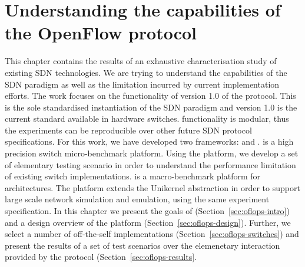 \chapter{Understanding the capabilities of the OpenFlow protocol}
\ifpdf
    \graphicspath{{Chapter1/Chapter1Figs/PNG/}{Chapter1/Chapter1Figs/PDF/}{Chapter1/Chapter1Figs/}}
\else
    \graphicspath{{Chapter1/Chapter1Figs/EPS/}{Chapter1/Chapter1Figs/}}
\fi

This chapter contains the results of an exhaustive characterisation study of
existing SDN technologies. We are trying to understand the capabilities of the
SDN paradigm as well as the limitation incurred by current implementation
efforts. The work focuses on the functionality of version 1.0 of the \of
protocol. This is the sole standardised instantiation of the SDN paradigm and
version 1.0 is the current standard available in hardware switches.
\of functionality is modular, thus the experiments can be
reproducible over other future SDN protocol specifications.  For this work, we have
developed two frameworks: \oflops and \sdnsim. \oflops is a high precision \of
switch micro-benchmark platform. Using the platform, we develop a set of
elementary testing scenario in order to understand the performance limitation of
existing \of switch implementations.  \sdnsim is a macro-benchmark platform for
\of architectures. The platform extends the Unikernel abstraction in order to
support large scale network simulation and emulation, using the same
experiment specification. In this chapter we present
the goals of \oflops (Section~\ref{sec:oflops-intro}) and
a design overview of the \oflops platform (Section~\ref{sec:oflops-design}).
Further, we select a number of off-the-self \of implementations
(Section~\ref{sec:oflops-switches}) and present the results of a set of \oflops
test scenarios over the elemenetary interaction provided by the protocol 
(Section~\ref{sec:oflops-results}. 



